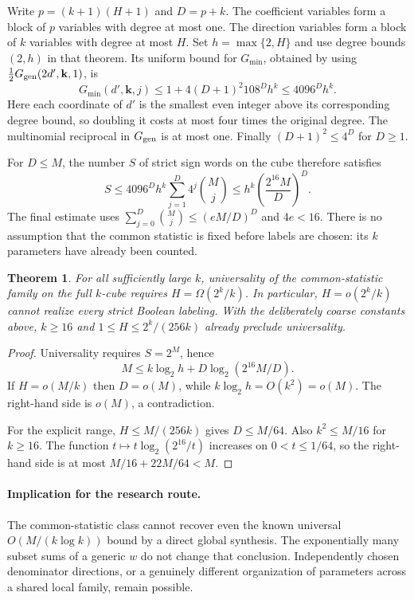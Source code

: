 \documentclass{article}
\newtheorem{theorem}{Theorem}
\begin{document}
Write $p=(k+1)(H+1)$ and $D=p+k$. The coefficient variables form a
block of $p$ variables with degree at most one. The direction variables
form a block of $k$ variables with degree at most $H$. Set
$h=\max\{2,H\}$ and use degree bounds $(2,h)$ in that theorem.
Its uniform bound for $G_{\min}$, obtained by using
$\frac12G_{\rm gen}(2d',\mathbf k,1)$, is
\[
 G_{\min}(d',\mathbf k,j)
 \leq 1+4(D+1)^2 108^D h^k
 \leq 4096^D h^k.
\]
Here each coordinate of $d'$ is the smallest even integer above its
corresponding degree bound, so doubling it costs at most four times the
original degree. The multinomial reciprocal in $G_{\rm gen}$ is at
most one. Finally $(D+1)^2\leq4^D$ for $D\geq1$.

For $D\leq M$, the number $S$ of strict sign words on the cube therefore
satisfies
\[
 S\leq4096^D h^k\sum_{j=1}^D4^j\binom Mj
 \leq h^k\left(\frac{2^{16}M}{D}\right)^D.
\]
The final estimate uses
$\sum_{j=0}^D\binom Mj\leq(eM/D)^D$ and $4e<16$.
There is no assumption that the common statistic is fixed before labels
are chosen: its $k$ parameters have already been counted.

\begin{theorem}
For all sufficiently large $k$, universality of the common-statistic
family on the full $k$-cube requires $H=\Omega(2^k/k)$.
In particular, $H=o(2^k/k)$ cannot realize every strict Boolean labeling.
With the deliberately coarse constants above, $k\geq16$ and
$1\leq H\leq2^k/(256k)$ already preclude universality.
\end{theorem}
\begin{proof}
Universality requires $S=2^M$, hence
\[
 M\leq k\log_2 h+D\log_2(2^{16}M/D).
\]
If $H=o(M/k)$ then $D=o(M)$, while $k\log_2 h=O(k^2)=o(M)$.
The right-hand side is $o(M)$, a contradiction.

For the explicit range, $H\leq M/(256k)$ gives $D\leq M/64$.
Also $k^2\leq M/16$ for $k\geq16$. The function
$t\mapsto t\log_2(2^{16}/t)$ increases on $0<t\leq1/64$,
so the right-hand side is at most
$M/16+22M/64<M$.
\end{proof}

\paragraph{Implication for the research route.}
The common-statistic class cannot recover even the known universal
$O(M/(k\log k))$ bound by a direct global synthesis. The exponentially
many subset sums of a generic $w$ do not change that conclusion.
Independently chosen denominator directions, or a genuinely different
organization of parameters across a shared local family, remain possible.
\end{document}
